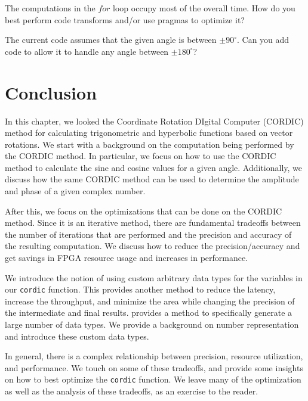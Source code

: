 \begin{exercise}
The computations in the $for$ loop occupy most of the overall time. How do you best perform code transforms and/or use pragmas to optimize it?
\end{exercise}

\begin{exercise}
The current code assumes that the given angle is between $\pm 90^{\circ}$. Can you add code to allow it to handle any angle between $\pm 180^{\circ}$?
\end{exercise}

\section{Conclusion}
In this chapter, we looked the Coordinate Rotation DIgital Computer (CORDIC) method for calculating trigonometric and hyperbolic functions based on vector rotations. We start with a background on the computation being performed by the CORDIC method. In particular, we focus on how to use the CORDIC method to calculate the sine and cosine values for a given angle. Additionally, we discuss how the same CORDIC method can be used to determine the amplitude and phase of a given complex number.

After this, we focus on the optimizations that can be done on the CORDIC method. Since it is an iterative method, there are fundamental tradeoffs between the number of iterations that are performed and the precision and accuracy of the resulting computation. We discuss how to reduce the precision/accuracy and get savings in FPGA resource usage and increases in performance.

We introduce the notion of using custom arbitrary data types for the variables in our \lstinline{cordic} function. This provides another method to reduce the latency, increase the throughput, and minimize the area while changing the precision of the intermediate and final results. \VHLS provides a method to specifically generate a large number of data types. We provide a background on number representation and introduce these custom data types. 

In general, there is a complex relationship between precision, resource utilization, and performance. We touch on some of these tradeoffs, and provide some insights on how to best optimize the \lstinline{cordic} function. We leave many of the optimization as well as the analysis of these tradeoffs, as an exercise to the reader. %